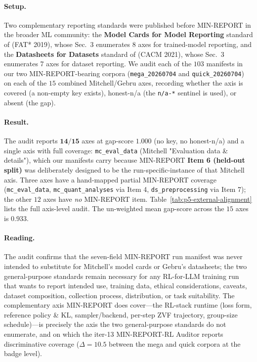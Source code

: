 \documentclass{article}  \usepackage[preprint,nonatbib]{neurips_2026} \usepackage[numbers]{natbib}
\providecommand{\tableref}[1]{Table~\ref{#1}}
\begin{document}
\paragraph{Setup.} Two complementary reporting standards were
published before MIN-REPORT in the broader ML community: the
\textbf{Model Cards for Model Reporting} standard of
\citet{mitchell2019modelcards} (FAT* 2019), whose Sec.~3 enumerates
8 axes for trained-model reporting, and the \textbf{Datasheets for
Datasets} standard of \citet{gebru2021datasheets} (CACM 2021), whose
Sec.~3 enumerates 7 axes for dataset reporting. We audit each of the
$103$ manifests in our two MIN-REPORT-bearing corpora
(\texttt{mega\_20260704} and \texttt{quick\_20260704}) on each of
the $15$ combined Mitchell/Gebru axes, recording whether the axis
is covered (a non-empty key exists), honest-n/a (the \texttt{n/a-*}
sentinel is used), or absent (the gap).

\paragraph{Result.} The audit reports $\mathbf{14/15}$ axes at
gap-score $1.000$ (no key, no honest-n/a) and a single axis with full
coverage: \texttt{mc\_eval\_data} (Mitchell "Evaluation data \&
details"), which our manifests carry because MIN-REPORT \textbf{Item 6
(held-out split)} was deliberately designed to be the
run-specific-instance of that Mitchell axis. Three axes have a
hand-mapped partial MIN-REPORT coverage (\texttt{mc\_eval\_data},
\texttt{mc\_quant\_analyses} via Item 4, \texttt{ds\_preprocessing}
via Item 7); the other $12$ axes have \emph{no} MIN-REPORT item.
\tableref{tab:p5-external-alignment} lists the full axis-level
audit. The un-weighted mean gap-score across the $15$ axes is
$0.933$.

\paragraph{Reading.} The audit confirms that the seven-field MIN-REPORT
run manifest was never intended to substitute for Mitchell's model
cards or Gebru's datasheets; the two general-purpose standards remain
necessary for any RL-for-LLM training run that wants to report
intended use, training data, ethical considerations, caveats,
dataset composition, collection process, distribution, or task
suitability. The complementary axis MIN-REPORT does cover---the
RL-stack runtime (loss form, reference policy \& KL, sampler/backend,
per-step ZVF trajectory, group-size schedule)---is precisely the axis
the two general-purpose standards do not enumerate, and on which the
iter-13 MIN-REPORT-RL Auditor reports discriminative coverage
($\Delta = 10.5$ between the mega and quick corpora at the badge
level).
\end{document}
